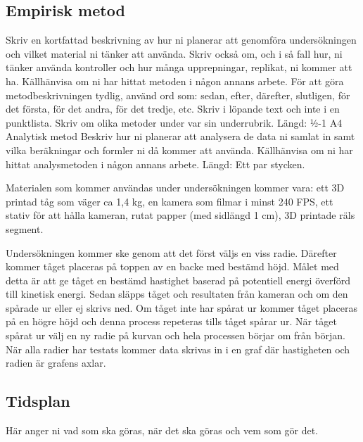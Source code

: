 \subsection{Empirisk metod}
Skriv en kortfattad beskrivning av hur ni planerar att genomföra undersökningen och vilket material ni tänker att använda. Skriv också om, och i så fall hur, ni tänker använda kontroller och hur många upprepningar, replikat, ni kommer att ha. Källhänvisa om ni har hittat metoden i någon annans arbete. För att göra metodbeskrivningen tydlig, använd ord som: sedan, efter, därefter, slutligen, för det första, för det andra, för det tredje, etc. Skriv i löpande text och inte i en punktlista. Skriv om olika metoder under var sin underrubrik.
Längd: ½-1 A4
Analytisk metod
Beskriv hur ni planerar att analysera de data ni samlat in samt vilka beräkningar och formler ni då kommer att använda. Källhänvisa om ni har hittat analysmetoden i någon annans arbete.
Längd: Ett par stycken.

Materialen som kommer användas under undersökningen kommer vara: ett 3D printad tåg som väger ca 1,4 kg, en kamera som filmar i minst 240 FPS, ett stativ för att hålla kameran, rutat papper (med sidlängd 1 cm), 3D printade räls segment. 

Undersökningen kommer ske genom att det först väljs en viss radie. Därefter kommer tåget placeras på toppen av en backe med bestämd höjd. Målet med detta är att ge tåget en bestämd hastighet baserad på potentiell energi överförd till kinetisk energi. Sedan släpps tåget och resultaten från kameran och om den spårade ur eller ej skrivs ned. Om tåget inte har spårat ur kommer tåget placeras på en högre höjd och denna process repeteras tills tåget spårar ur. När tåget spårat ur välj en ny radie på kurvan och hela processen börjar om från början. När alla radier har testats kommer data skrivas in i en graf där hastigheten och radien är grafens axlar.



\subsection{Tidsplan}
Här anger ni vad som ska göras, när det ska göras och vem som gör det.